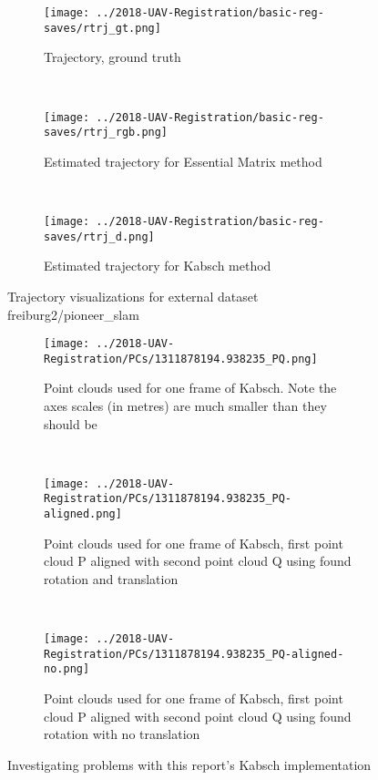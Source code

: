 \documentclass[12pt,a4paper]{article}
\begin{document}
\begin{figure}[p]
  \centering
  \begin{subfigure}[t]{\textwidth}
  \centering
    \texttt{[image: ../2018-UAV-Registration/basic-reg-saves/rtrj\_gt.png]}
  \caption{Trajectory, ground truth}
  \end{subfigure}
  \\
  \begin{subfigure}[t]{0.5\textwidth}
  \centering
    \texttt{[image: ../2018-UAV-Registration/basic-reg-saves/rtrj\_rgb.png]}
  \caption{Estimated trajectory for Essential Matrix method}
  \end{subfigure}%
  ~
  \begin{subfigure}[t]{0.5\textwidth}
  \centering
    \texttt{[image: ../2018-UAV-Registration/basic-reg-saves/rtrj\_d.png]}
  \caption{Estimated trajectory for Kabsch method}
  \end{subfigure}
  \caption{Trajectory visualizations for external dataset freiburg2/pioneer\_slam}
  \label{f: fr2/slam trj}
\end{figure}

\begin{figure}[p]
  \centering
  \begin{subfigure}[t]{\textwidth}
  \centering
  \texttt{[image: ../2018-UAV-Registration/PCs/1311878194.938235\_PQ.png]}
  \caption{Point clouds used for one frame of Kabsch. Note the axes scales (in metres) are much smaller than they should be}
  \label{f: PC bad scaling}
  \end{subfigure}
  \\
  \begin{subfigure}[t]{0.5\textwidth}
  \centering
  \texttt{[image: ../2018-UAV-Registration/PCs/1311878194.938235\_PQ-aligned.png]}
  \caption{Point clouds used for one frame of Kabsch, first point cloud P aligned with second point cloud Q using found rotation and translation}
  \label{f: Kabsch no translation}
  \end{subfigure}%
  ~
    \begin{subfigure}[t]{0.5\textwidth}
  \centering
  \texttt{[image: ../2018-UAV-Registration/PCs/1311878194.938235\_PQ-aligned-no.png]}
  \caption{Point clouds used for one frame of Kabsch, first point cloud P aligned with second point cloud Q using found rotation with no translation}
  \label{f: Kabsch no translation no}
  \end{subfigure}
  \caption{Investigating problems with this report's Kabsch implementation}
\end{figure}
\end{document}
